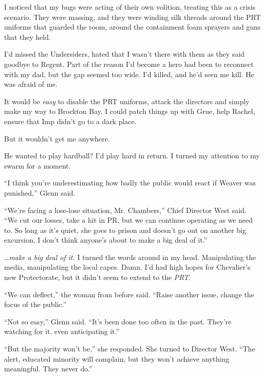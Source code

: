 I noticed that my bugs were acting of their own volition, treating this as a crisis scenario.  They were massing, and they were winding silk threads around the PRT uniforms that guarded the room, around the containment foam sprayers and guns that they held.



I'd missed the Undersiders, hated that I wasn't there with them as they said goodbye to Regent.  Part of the reason I'd become a hero had been to reconnect with my dad, but the gap seemed too wide.  I'd killed, and he'd seen me kill.  He was afraid of me.



It would be \emph{easy} to disable the PRT uniforms, attack the directors and simply make my way to Brockton Bay.  I could patch things up with Grue, help Rachel, ensure that Imp didn't go to a dark place.



But it wouldn't get me anywhere.



He wanted to play hardball?  I'd play hard in return.  I turned my attention to my swarm for a moment.



``I think you're underestimating how badly the public would react if Weaver was punished,'' Glenn said.



``We're facing a lose-lose situation, Mr. Chambers,'' Chief Director West said.  ``We cut our losses, take a hit in PR, but we can continue operating as we need to.  So long as it's quiet, she goes to prison and doesn't go out on another big excursion, I don't think anyone's about to make a big deal of it.''



\emph{\ldots{}make a big deal of it. } I turned the words around in my head.  Manipulating the media, manipulating the local capes.  Damn.  I'd had high hopes for Chevalier's new Protectorate, but it didn't seem to extend to the \emph{PRT}.



``We can deflect,'' the woman from before said.  ``Raise another issue, change the focus of the public.''



``Not so easy,'' Glenn said.  ``It's been done too often in the past.  They're watching for it, even anticipating it.''



``But the majority won't be,'' she responded.  She turned to Director West.  ``The alert, educated minority will complain, but they won't achieve anything meaningful.  They never do.''



